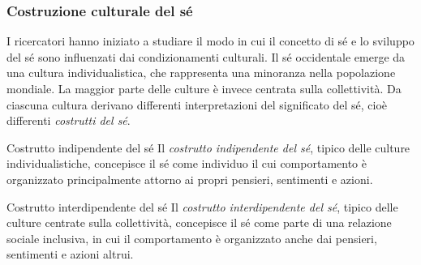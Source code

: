 \documentclass[a4paper]{article}
\begin{document}
\subsubsection{Costruzione culturale del sé}
I ricercatori hanno iniziato a studiare il modo in cui il concetto di sé e lo sviluppo del sé sono influenzati dai condizionamenti culturali.
Il sé occidentale emerge da una cultura individualistica, che rappresenta una minoranza nella popolazione mondiale. La maggior parte delle culture è invece centrata sulla collettività.
Da ciascuna cultura derivano differenti interpretazioni del significato del sé, cioè differenti \emph{costrutti del sé}.
\begin{snippetdefinition}{Costrutto indipendente del sé}
    Il \emph{costrutto indipendente del sé}, tipico delle culture individualistiche, concepisce il sé come individuo il cui comportamento è organizzato principalmente attorno ai propri pensieri, sentimenti e azioni.
\end{snippetdefinition}
\begin{snippetdefinition}{Costrutto interdipendente del sé}
    Il \emph{costrutto interdipendente del sé}, tipico delle culture centrate sulla collettività, concepisce il sé come parte di una relazione sociale inclusiva, in cui il comportamento è organizzato anche dai pensieri, sentimenti e azioni altrui.
\end{snippetdefinition}
\end{document}
